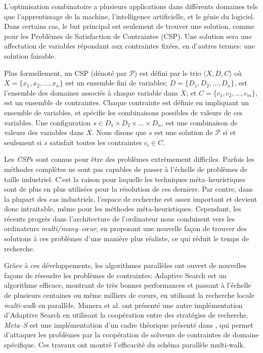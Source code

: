 L'optimisation combinatoire a plusieurs applications dans diff\'erents domaines tels que l'apprentissage de la machine, l'intelligence artificielle, et le g\'enie du logiciel. Dans certains cas, le but principal est seulement de trouver une solution, comme pour les Probl\`emes de Satisfaction de Contraintes (CSP). Une solution sera une affectation de variables r\'epondant aux contraintes fix\'ees, en d'autres termes: une solution faisable.

Plus formellement, un CSP (d\'enot\'e par $\mathcal{P}$) est d\'efini par le trio $\langle X,D,C \rangle$  o\`u $X = \{x_1, x_2,\dots,x_n\}$ est un ensemble fini de variables; $D = \{D_1, D_2,\dots, D_n\}$, est l'ensemble des domaines associ\'es \`a chaque variable dans $X$; et $C = \{c_1, c_2,\dots,c_m\}$, est un ensemble de contraintes. Chaque contrainte est d\'efinie en impliquant un ensemble de variables, et sp\'ecifie les combinaisons possibles de valeurs de ces variables. Une configuration $s\in D_1\times D_2\times\dots\times D_n$, est une combinaison de valeurs des variables dans $X$. Nous disons que $s$ est une solution de $\mathcal{P}$ si et seulement si $s$ satisfait toutes les contraintes $c_i \in C$.

Les {\it CSP}s sont connus pour \^etre des probl\`emes extr\^emement difficiles. Parfois les m\'ethodes compl\`etes ne sont pas capables de passer \`a l'\'echelle de probl\`emes de taille industriel. C'est la raison  pour laquelle les techniques m\'eta--heuristiques sont de plus en plus utilis\'ees pour la r\'esolution de ces derniers. Par contre, dans la plupart des cas industriels, l'espace de recherche est assez important et devient donc intraitable, m\^eme pour les m\'ethodes m\'eta-heuristiques. Cependant, les r\'ecents progr\`es dans l'architecture de l'ordinateur nous conduisent vers les ordinateurs {\it multi/many--c\oe ur}, en proposant une nouvelle fa\c{c}on de trouver des solutions \`a ces probl\`emes d'une mani\`ere plus r\'ealiste, ce qui r\'eduit le temps de recherche.

Gr\^ace \`a ces d\'eveloppements, les algorithmes parall\`eles ont ouvert de nouvelles fa\c{c}ons de r\'esoudre les probl\`emes de contraintes: Adaptive Search \cite{Diaz} est un algorithme efficace, montrant de tr\`es bonnes performances et passant \`a l'\'echelle de plusieurs centaines ou m\^eme milliers de c\oe urs, en utilisant la recherche locale {\it multi-walk} en parall\`ele. Munera et al. \cite{Munera} ont pr\'esent\'e une autre impl\'ementation d'Adaptive Search en utilisant la coop\'eration entre des strat\'egies de recherche. {\it Meta--S} est une impl\'ementation d'un cadre th\'eorique pr\'esent\'e dans \cite{Frank2003}, qui permet d'attaquer les probl\`emes par la coop\'eration de solveurs de contraintes de domaine sp\'ecifique. 
Ces travaux ont montr\'e l'efficacit\'e du sch\'ema parall\`ele multi-walk.  

